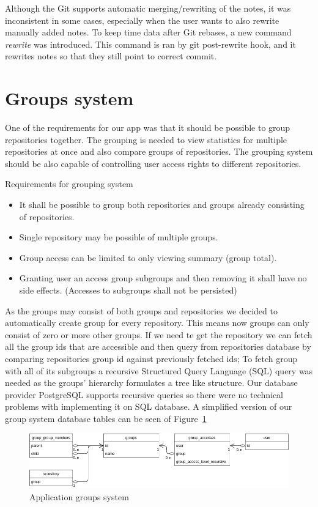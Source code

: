 Although the Git supports automatic merging/rewriting of the notes, it was inconsistent in some cases, especially when the user
wants to also rewrite manually added notes.
To keep time data after Git rebases, a new command \textit{rewrite} was introduced.
This command is ran by git post-rewrite hook, and it rewrites notes so that they still point to correct commit.

\section{Groups system}\label{sec:group-system}
One of the requirements for our app was that it should be possible to group repositories together.
The grouping is needed to view statistics for multiple repositories at once and also compare groups of repositories.
The grouping system should be also capable of controlling user access rights to different repositories.

Requirements for grouping system
\begin{itemize}
    \item It shall be possible to group both repositories and groups already consisting of repositories.
    \item Single repository may be possible of multiple groups.
    \item Group access can be limited to only viewing summary (group total).
    \item Granting user an access group subgroups and then removing it shall have no side effects. (Accesses to subgroups shall not be persisted)
\end{itemize}

As the groups may consist of both groups and repositories we decided to automatically create group for every repository.
This means now groups can only consist of zero or more other groups.
If we need te get the repository we can fetch all the group ids that are accessible and then query from repositories database by
comparing repositories group id against previously fetched ids;
To fetch group with all of its subgroups a recursive Structured Query Language (SQL) query was needed as the groups'
hierarchy formulates a tree like structure.
Our database provider PostgreSQL supports recursive queries so there were no technical problems with implementing it on SQL database.
A simplified version of our group system database tables can be seen of Figure~\ref{fig:group-system}

\begin{figure}[h]
    \includegraphics[width=\textwidth]{figures/group_system}
    \caption{Application groups system}
    \label{fig:group-system}
\end{figure}

